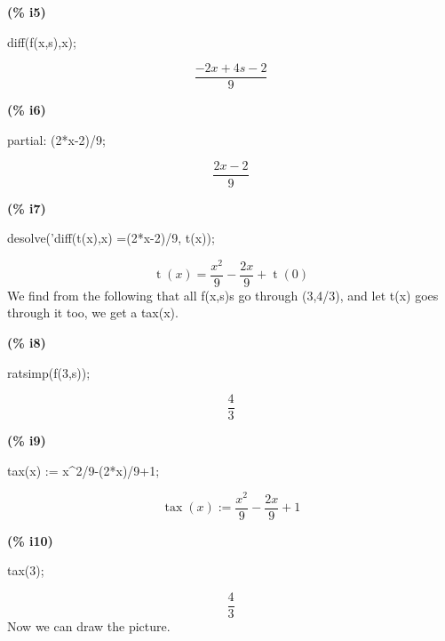 \noindent
\begin{minipage}[t]{8ex}\color{red}\bf
(\% i5)
\end{minipage}
\begin{minipage}[t]{\textwidth}\color{blue}
diff(f(x,s),x);
\end{minipage}
\[\displaystyle
\tag{\% o5} 
\frac{-2 x+4 s-2}{9}\mbox{}
\]


\noindent
\begin{minipage}[t]{8ex}\color{red}\bf
(\% i6)
\end{minipage}
\begin{minipage}[t]{\textwidth}\color{blue}
partial: (2*x-2)/9;
\end{minipage}
\[\displaystyle
\tag{partial}
\frac{2 x-2}{9}\mbox{}
\]


\noindent
\begin{minipage}[t]{8ex}\color{red}\bf
(\% i7)
\end{minipage}
\begin{minipage}[t]{\textwidth}\color{blue}
desolve('diff(t(x),x) =(2*x-2)/9, t(x));
\end{minipage}
\[\displaystyle
\tag{\% o7} 
\operatorname{t}(x)=\frac{{{x}^{2}}}{9}-\frac{2 x}{9}+\operatorname{t}(0)\mbox{}
\]
We find from the following that all f(x,s)s go through (3,4/3), and let t(x) goes through it too, we get a tax(x). 


\noindent
\begin{minipage}[t]{8ex}\color{red}\bf
(\% i8)
\end{minipage}
\begin{minipage}[t]{\textwidth}\color{blue}
ratsimp(f(3,s));
\end{minipage}
\[\displaystyle
\tag{\% o8} 
\frac{4}{3}\mbox{}
\]


\noindent
\begin{minipage}[t]{8ex}\color{red}\bf
(\% i9)
\end{minipage}
\begin{minipage}[t]{\textwidth}\color{blue}
tax(x) := x\^{}2/9-(2*x)/9+1;
\end{minipage}
\[\displaystyle
\tag{\% o9} 
\operatorname{tax}(x):=\frac{{{x}^{2}}}{9}-\frac{2 x}{9}+1\mbox{}
\]


\noindent
\begin{minipage}[t]{8ex}\color{red}\bf
(\% i10)
\end{minipage}
\begin{minipage}[t]{\textwidth}\color{blue}
tax(3);
\end{minipage}
\[\displaystyle
\tag{\% o10} 
\frac{4}{3}\mbox{}
\]
Now we can draw the picture. 


